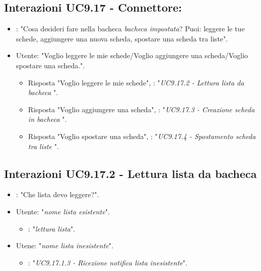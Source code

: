 \subsection{Interazioni  UC9.17 - Connettore: }
 \begin{itemize}
        \item {}: "Cosa desideri fare nella bacheca {\it bacheca impostata}? Puoi: leggere le tue schede, aggiungere una nuova scheda, spostare una scheda tra liste".
        \item Utente: "Voglio leggere le mie schede/Voglio aggiungere una scheda/Voglio spostare una scheda.".
        \begin{itemize}
         \item{Risposta "Voglio leggere le mie schede"}, : "{\it UC9.17.2 - Lettura lista da bacheca }".
         \item{Risposta "Voglio aggiungere una scheda"}, : "{\it  UC9.17.3 - Creazione scheda in bacheca }".
         \item{Risposta "Voglio spostare una scheda"}, : "{\it UC9.17.4 - Spostamento scheda tra liste }".
         \end{itemize}
    \end{itemize}


\subsection{Interazioni UC9.17.2 - Lettura lista da bacheca }
 \begin{itemize}
        \item {}: "Che lista devo leggere?".
        \item Utente: "{\it nome lista esistente}".
        \begin{itemize}
        \item {}: "{\it lettura lista}".
           \end{itemize}
        \item Utene: "{\it nome lista inesistente}".
           \begin{itemize}
        \item {}: "{\it UC9.17.1.3 - Ricezione notifica lista inesistente}".
           \end{itemize}
    \end{itemize}


